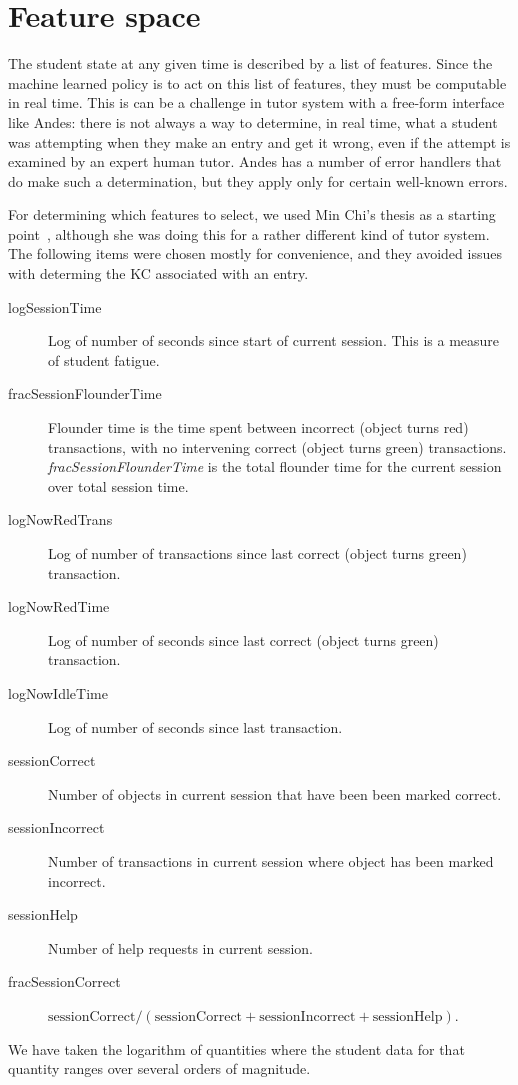 \documentclass[11pt,letterpaper]{article}
\begin{document}
\section{Feature space}

The student state at any given time is described by a list of
features.   Since the machine learned policy is to act on this list of
features, they must be computable in real time.  This is can be a
challenge in tutor system with a free-form interface like  Andes:
there is not always a way to determine, in real time, what a student was
attempting when they make an entry and get it wrong, even if the attempt
is examined by an expert human tutor.  Andes has a
number of error handlers that do make such a determination, but they 
apply only for certain well-known errors.

For determining which features to select, we used Min Chi's thesis
as a starting point~\cite{mint}, although she was doing this for a
rather different kind of tutor system.  The following items were
chosen mostly for convenience, and they avoided issues with determing
the KC associated with an entry.
%
\begin{description}

\item[logSessionTime] Log of number of seconds since start of current
  session.  This is a measure of student fatigue.

\item[fracSessionFlounderTime] Flounder time is the time spent between 
incorrect (object turns red) transactions, with no intervening correct 
(object turns green) transactions. 
 {\em fracSessionFlounderTime} is the total flounder
time for the current session over total session time.

\item[logNowRedTrans] Log of number of transactions since last
  correct (object turns green) transaction.

\item[logNowRedTime] Log of number of seconds since last
  correct (object turns green) transaction.

\item[logNowIdleTime] Log of number of seconds since last transaction.

\item[sessionCorrect] Number of objects in current session that have
  been  been marked  correct.

\item[sessionIncorrect] Number of transactions in current session where 
   object has been marked  incorrect.

\item[sessionHelp] Number of help requests in current session.

\item[fracSessionCorrect] $\mbox{sessionCorrect}/\left(\mbox{sessionCorrect}+\mbox{sessionIncorrect}+\mbox{sessionHelp}\right)$.

\end{description}
%
We have taken the logarithm of quantities where the student data
for that quantity ranges over several orders of magnitude.
\end{document}
